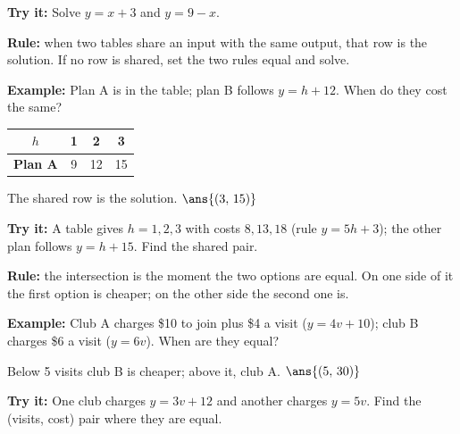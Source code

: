 \documentclass[12pt]{article}
\begin{document}
\begin{tryitbox}
\textbf{Try it:} \quad Solve $y = x + 3$ and $y = 9 - x$.\\[2pt]
\end{tryitbox}


\begin{formulabox}
\textbf{Rule:} when two tables share an input with the same output, that row
is the solution. If no row is shared, set the two rules equal and solve.
\end{formulabox}

\begin{examplebox}
\textbf{Example:} \quad Plan A is in the table; plan B follows $y = h + 12$.
When do they cost the same?
\begin{center}
\begin{tabular}{|c|c|c|c|}
\hline
$h$ & 1 & 2 & 3 \\ \hline
\textbf{Plan A} & 9 & 12 & 15 \\ \hline
\end{tabular}
\end{center}

The shared row is the solution. \quad $\ans{(3,\, 15)}$
\end{examplebox}

\begin{tryitbox}
\textbf{Try it:} \quad A table gives $h = 1, 2, 3$ with costs $8, 13, 18$
(rule $y = 5h + 3$); the other plan follows $y = h + 15$. Find the shared
pair.\\[2pt]
\end{tryitbox}


\begin{formulabox}
\textbf{Rule:} the intersection is the moment the two options are equal. On
one side of it the first option is cheaper; on the other side the second one
is.
\end{formulabox}

\begin{examplebox}
\textbf{Example:} \quad Club A charges \$10 to join plus \$4 a visit
($y = 4v + 10$); club B charges \$6 a visit ($y = 6v$). When are they equal?

Below 5 visits club B is cheaper; above it, club A. \quad $\ans{(5,\, 30)}$
\end{examplebox}

\begin{tryitbox}
\textbf{Try it:} \quad One club charges $y = 3v + 12$ and another charges
$y = 5v$. Find the (visits, cost) pair where they are equal.\\[2pt]
\end{tryitbox}
\end{document}
